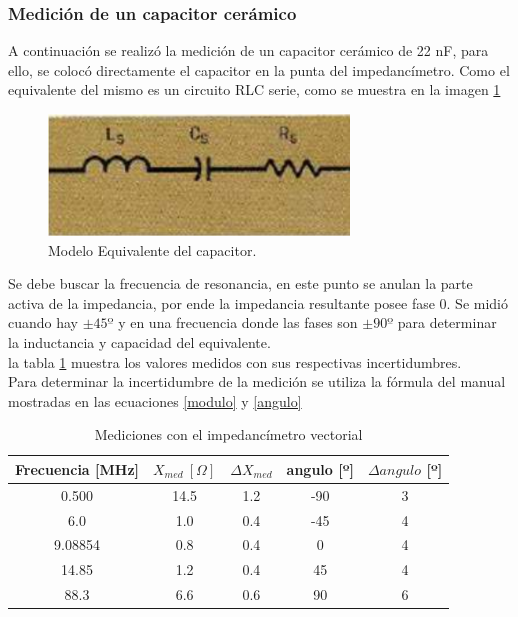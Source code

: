 \documentclass[a4paper,10pt]{article}
\begin{document}
		\subsubsection{Medición de un capacitor cerámico}
		\indent A continuación se realizó la medición de un capacitor cerámico
		de 22 nF, para ello, se colocó directamente el capacitor en la punta 
		del impedancímetro. Como el equivalente del mismo es un circuito RLC 
		serie, como se muestra en la imagen \ref{imagenCapacitor} 
		
		\begin{figure}[!htb]
			\centering
			\includegraphics[width=8cm]{Imagenes/EsqCapacitor.png}
			\caption{Modelo Equivalente del capacitor.}
			\label{imagenCapacitor} 
		\end{figure}
		
		Se debe buscar la frecuencia de resonancia, en este punto se anulan la 
		parte activa de la impedancia, por ende la impedancia resultante posee
		fase 0. Se midió cuando hay $\pm 45º$ y en una frecuencia donde las fases
		son $\pm 90º$ para determinar la inductancia y capacidad del equivalente.
		\\
		\indent la tabla \ref{unaTab} muestra los valores medidos con sus 
		respectivas incertidumbres. \\
		\indent Para determinar la incertidumbre de la medición se utiliza la 
		fórmula del manual mostradas en las ecuaciones \ref{modulo} y 
		\ref{angulo}
		
		\begin{table}[!htp]
			\centering
			\begin{tabular}{|c|c|c|c|c|}
				\hline
				Frecuencia [MHz] & $X_{med}~[\Omega] $ & $\Delta X_{med}$ & 
				angulo [º] & $\Delta angulo$ [º] \\
				\hline
				0.500 & 14.5 & 1.2 & -90 & 3 \\
				\hline
				6.0 & 1.0 & 0.4 & -45 & 4 \\
				\hline
				9.08854 & 0.8 & 0.4 & 0 & 4 \\ 
				\hline
				14.85 & 1.2 & 0.4 & 45 & 4 \\
				\hline
				88.3 & 6.6 & 0.6 & 90 & 6 \\ 
				\hline									
			\end{tabular}
			\caption{Mediciones con el impedancímetro vectorial} \label{unaTab}
		\end{table}
\end{document}
